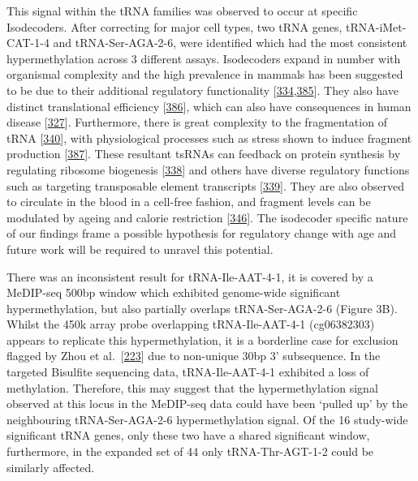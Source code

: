 \documentclass[
]{book}
\begin{document}
This signal within the tRNA families was observed to occur at specific Isodecoders.
After correcting for major cell types, two tRNA genes, tRNA-iMet-CAT-1-4 and tRNA-Ser-AGA-2-6, were identified which had the most consistent hypermethylation across 3 different assays.
Isodecoders expand in number with organismal complexity and the high prevalence in mammals has been suggested to be due to their additional regulatory functionality {[}\protect\hyperlink{ref-Keam2014}{334},\protect\hyperlink{ref-Goodenbour2006}{385}{]}.
They also have distinct translational efficiency {[}\protect\hyperlink{ref-Geslain2010}{386}{]}, which can also have consequences in human disease {[}\protect\hyperlink{ref-Kirchner2017}{327}{]}.
Furthermore, there is great complexity to the fragmentation of tRNA {[}\protect\hyperlink{ref-Schimmel2017}{340}{]}, with physiological processes such as stress shown to induce fragment production {[}\protect\hyperlink{ref-Li2019}{387}{]}.
These resultant tsRNAs can feedback on protein synthesis by regulating ribosome biogenesis {[}\protect\hyperlink{ref-Kim2017}{338}{]} and others have diverse regulatory functions such as targeting transposable element transcripts {[}\protect\hyperlink{ref-Martinez2017}{339}{]}.
They are also observed to circulate in the blood in a cell-free fashion, and fragment levels can be modulated by ageing and calorie restriction {[}\protect\hyperlink{ref-Dhahbi2013}{346}{]}.
The isodecoder specific nature of our findings frame a possible hypothesis for regulatory change with age and future work will be required to unravel this potential.

There was an inconsistent result for tRNA-Ile-AAT-4-1, it is covered by a MeDIP-seq 500bp window which exhibited genome-wide significant hypermethylation, but also partially overlaps tRNA-Ser-AGA-2-6 (Figure 3B).
Whilst the 450k array probe overlapping tRNA-Ile-AAT-4-1 (cg06382303) appears to replicate this hypermethylation, it is a borderline case for exclusion flagged by Zhou et al.~{[}\protect\hyperlink{ref-Zhou2017}{223}{]} due to non-unique 30bp 3' subsequence.
In the targeted Bisulfite sequencing data, tRNA-Ile-AAT-4-1 exhibited a loss of methylation.
Therefore, this may suggest that the hypermethylation signal observed at this locus in the MeDIP-seq data could have been `pulled up' by the neighbouring tRNA-Ser-AGA-2-6 hypermethylation signal.
Of the 16 study-wide significant tRNA genes, only these two have a shared significant window, furthermore, in the expanded set of 44 only tRNA-Thr-AGT-1-2 could be similarly affected.
\end{document}
